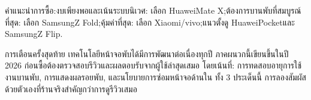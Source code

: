 คำแนะนำการซื้อ:งบเพียงพอและเน้นระบบนิเวศ: เลือก HuaweiMate X;ต้องการบานพับที่สมบูรณ์ที่สุด: เลือก SamsungZ Fold;คุ้มค่าที่สุด: เลือก Xiaomi/vivo;แนวตั้งดู HuaweiPocketและ SamsungZ Flip.

\begin{tcbinfo}{การเตือนครั้งสุดท้าย}
เทคโนโลยีหน้าจอพับได้มีการพัฒนาต่อเนื่องทุกปี ภาคผนวกนี้เขียนขึ้นในปี 2026 ก่อนซื้อต้องตรวจสอบรีวิวและผลตอบรับจากผู้ใช้ล่าสุดเสมอ โดยเน้นที่: การทดสอบอายุการใช้งานบานพับ, การแสดงผลรอยพับ, และนโยบายการซ่อมหน้าจอด้านใน ทั้ง 3 ประเด็นนี้ การลองสัมผัสด้วยตัวเองที่ร้านจริงสำคัญกว่าการดูรีวิวเสมอ

\end{tcbinfo}
